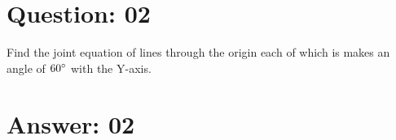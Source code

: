 \documentclass[17pt]{extarticle}
\begin{document}
\begin{fleqn}
\section{Question: 02}

Find the joint equation of lines through the origin each of which is makes an angle of $60\degree$ with the Y-axis.



\section{Answer: 02}



\end{fleqn}
\end{document}
